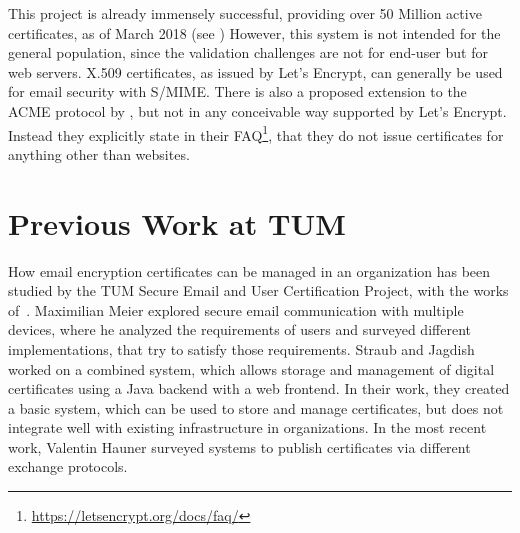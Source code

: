 This project is already immensely successful, providing over 50 Million active certificates, as of March 2018 (see
)
However, this system is not intended for the general population, since the validation challenges are not for end-user but for web servers.
X.509 certificates, as issued by Let's Encrypt, can generally be used for email security with S/MIME\@.
There is also a proposed extension to the ACME protocol by \citet{melnikovAcmeSmime}, but not in any conceivable way
supported by Let's Encrypt.
Instead they explicitly state in their FAQ\footnote{\url{https://letsencrypt.org/docs/faq/}},
that they do not issue certificates for anything other than websites.

\section*{Previous Work at TUM}
How email encryption certificates can be managed in an organization has been studied by the TUM Secure Email and User
Certification Project, with the works
of~\citet{hauner2016interoperability, jagdish2016certservice, straub2016directoryservice, maier2015multidevice}.
Maximilian Meier explored secure email communication with multiple devices, where he analyzed the requirements of
users and surveyed different implementations, that try to satisfy those requirements.
Straub and Jagdish worked on a combined system, which allows storage and management of digital certificates using a Java
backend with a web frontend.
In their work, they created a basic system, which can be used to store and manage certificates, but does not integrate
well with existing infrastructure in organizations.
In the most recent work, Valentin Hauner surveyed systems to publish certificates via different exchange protocols.
